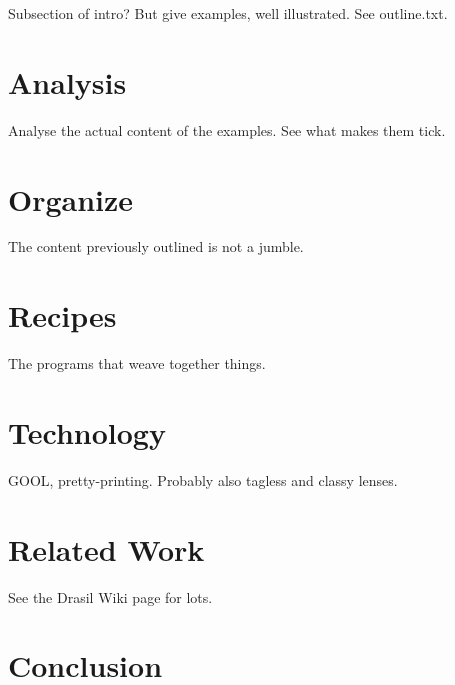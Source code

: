 \documentclass[english,submission]{programming}
\begin{document}
Subsection of intro? But give examples, well illustrated. See outline.txt.


\section{Analysis}
\label{sec:analysis}

Analyse the actual content of the examples. See what makes them tick.

\section{Organize}
\label{sec:organize}

The content previously outlined is not a jumble.

\section{Recipes}
\label{sec:recipes}

The programs that weave together things.

\section{Technology}
\label{sec:tech}

GOOL, pretty-printing. Probably also tagless and classy lenses.

\section{Related Work}
\label{sec:relwork}

See the Drasil Wiki page for lots.

\section{Conclusion}
\label{sec:conc}
\end{document}
